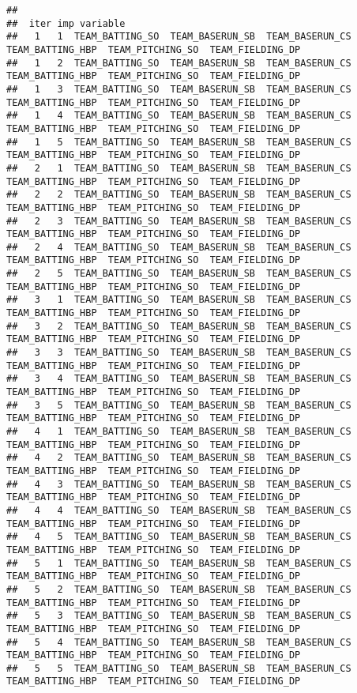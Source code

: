 \documentclass[
]{article}
\begin{document}
\begin{verbatim}
## 
##  iter imp variable
##   1   1  TEAM_BATTING_SO  TEAM_BASERUN_SB  TEAM_BASERUN_CS  TEAM_BATTING_HBP  TEAM_PITCHING_SO  TEAM_FIELDING_DP
##   1   2  TEAM_BATTING_SO  TEAM_BASERUN_SB  TEAM_BASERUN_CS  TEAM_BATTING_HBP  TEAM_PITCHING_SO  TEAM_FIELDING_DP
##   1   3  TEAM_BATTING_SO  TEAM_BASERUN_SB  TEAM_BASERUN_CS  TEAM_BATTING_HBP  TEAM_PITCHING_SO  TEAM_FIELDING_DP
##   1   4  TEAM_BATTING_SO  TEAM_BASERUN_SB  TEAM_BASERUN_CS  TEAM_BATTING_HBP  TEAM_PITCHING_SO  TEAM_FIELDING_DP
##   1   5  TEAM_BATTING_SO  TEAM_BASERUN_SB  TEAM_BASERUN_CS  TEAM_BATTING_HBP  TEAM_PITCHING_SO  TEAM_FIELDING_DP
##   2   1  TEAM_BATTING_SO  TEAM_BASERUN_SB  TEAM_BASERUN_CS  TEAM_BATTING_HBP  TEAM_PITCHING_SO  TEAM_FIELDING_DP
##   2   2  TEAM_BATTING_SO  TEAM_BASERUN_SB  TEAM_BASERUN_CS  TEAM_BATTING_HBP  TEAM_PITCHING_SO  TEAM_FIELDING_DP
##   2   3  TEAM_BATTING_SO  TEAM_BASERUN_SB  TEAM_BASERUN_CS  TEAM_BATTING_HBP  TEAM_PITCHING_SO  TEAM_FIELDING_DP
##   2   4  TEAM_BATTING_SO  TEAM_BASERUN_SB  TEAM_BASERUN_CS  TEAM_BATTING_HBP  TEAM_PITCHING_SO  TEAM_FIELDING_DP
##   2   5  TEAM_BATTING_SO  TEAM_BASERUN_SB  TEAM_BASERUN_CS  TEAM_BATTING_HBP  TEAM_PITCHING_SO  TEAM_FIELDING_DP
##   3   1  TEAM_BATTING_SO  TEAM_BASERUN_SB  TEAM_BASERUN_CS  TEAM_BATTING_HBP  TEAM_PITCHING_SO  TEAM_FIELDING_DP
##   3   2  TEAM_BATTING_SO  TEAM_BASERUN_SB  TEAM_BASERUN_CS  TEAM_BATTING_HBP  TEAM_PITCHING_SO  TEAM_FIELDING_DP
##   3   3  TEAM_BATTING_SO  TEAM_BASERUN_SB  TEAM_BASERUN_CS  TEAM_BATTING_HBP  TEAM_PITCHING_SO  TEAM_FIELDING_DP
##   3   4  TEAM_BATTING_SO  TEAM_BASERUN_SB  TEAM_BASERUN_CS  TEAM_BATTING_HBP  TEAM_PITCHING_SO  TEAM_FIELDING_DP
##   3   5  TEAM_BATTING_SO  TEAM_BASERUN_SB  TEAM_BASERUN_CS  TEAM_BATTING_HBP  TEAM_PITCHING_SO  TEAM_FIELDING_DP
##   4   1  TEAM_BATTING_SO  TEAM_BASERUN_SB  TEAM_BASERUN_CS  TEAM_BATTING_HBP  TEAM_PITCHING_SO  TEAM_FIELDING_DP
##   4   2  TEAM_BATTING_SO  TEAM_BASERUN_SB  TEAM_BASERUN_CS  TEAM_BATTING_HBP  TEAM_PITCHING_SO  TEAM_FIELDING_DP
##   4   3  TEAM_BATTING_SO  TEAM_BASERUN_SB  TEAM_BASERUN_CS  TEAM_BATTING_HBP  TEAM_PITCHING_SO  TEAM_FIELDING_DP
##   4   4  TEAM_BATTING_SO  TEAM_BASERUN_SB  TEAM_BASERUN_CS  TEAM_BATTING_HBP  TEAM_PITCHING_SO  TEAM_FIELDING_DP
##   4   5  TEAM_BATTING_SO  TEAM_BASERUN_SB  TEAM_BASERUN_CS  TEAM_BATTING_HBP  TEAM_PITCHING_SO  TEAM_FIELDING_DP
##   5   1  TEAM_BATTING_SO  TEAM_BASERUN_SB  TEAM_BASERUN_CS  TEAM_BATTING_HBP  TEAM_PITCHING_SO  TEAM_FIELDING_DP
##   5   2  TEAM_BATTING_SO  TEAM_BASERUN_SB  TEAM_BASERUN_CS  TEAM_BATTING_HBP  TEAM_PITCHING_SO  TEAM_FIELDING_DP
##   5   3  TEAM_BATTING_SO  TEAM_BASERUN_SB  TEAM_BASERUN_CS  TEAM_BATTING_HBP  TEAM_PITCHING_SO  TEAM_FIELDING_DP
##   5   4  TEAM_BATTING_SO  TEAM_BASERUN_SB  TEAM_BASERUN_CS  TEAM_BATTING_HBP  TEAM_PITCHING_SO  TEAM_FIELDING_DP
##   5   5  TEAM_BATTING_SO  TEAM_BASERUN_SB  TEAM_BASERUN_CS  TEAM_BATTING_HBP  TEAM_PITCHING_SO  TEAM_FIELDING_DP
\end{verbatim}
\end{document}
